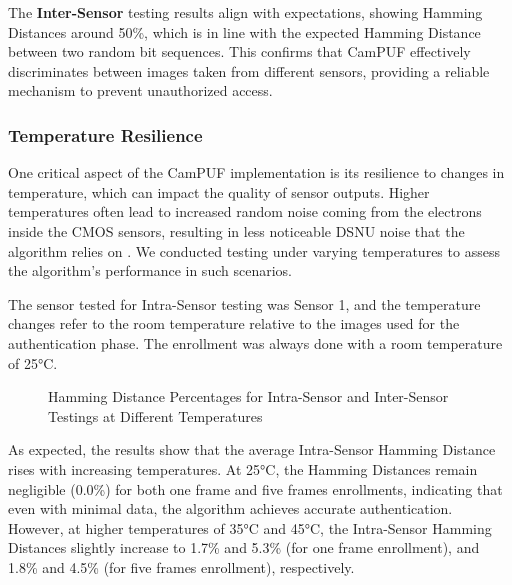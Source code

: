 The \textbf{Inter-Sensor} testing results align with expectations, showing Hamming Distances around 50\%, which is in line with the expected Hamming Distance between two random bit sequences. This confirms that CamPUF effectively discriminates between images taken from different sensors, providing a reliable mechanism to prevent unauthorized access.

\subsubsection{Temperature Resilience}\label{sec:temperature}

One critical aspect of the CamPUF implementation is its resilience to changes in temperature, which can impact the quality of sensor outputs. Higher temperatures often lead to increased random noise coming from the electrons inside the CMOS sensors, resulting in less noticeable DSNU noise that the algorithm relies on \cite{temperature}. We conducted testing under varying temperatures to assess the algorithm's performance in such scenarios.

The sensor tested for Intra-Sensor testing was Sensor 1, and the temperature changes refer to the room temperature relative to the images used for the authentication phase. The enrollment was always done with a room temperature of 25°C.

\begin{figure}[h!]
	\centering
	\caption{Hamming Distance Percentages for Intra-Sensor and Inter-Sensor Testings at Different Temperatures}
	\label{fig:temperature_graph}
\end{figure}

As expected, the results show that the average Intra-Sensor Hamming Distance rises with increasing temperatures. At 25°C, the Hamming Distances remain negligible (0.0\%) for both one frame and five frames enrollments, indicating that even with minimal data, the algorithm achieves accurate authentication. However, at higher temperatures of 35°C and 45°C, the Intra-Sensor Hamming Distances slightly increase to 1.7\% and 5.3\% (for one frame enrollment), and 1.8\% and 4.5\% (for five frames enrollment), respectively.

